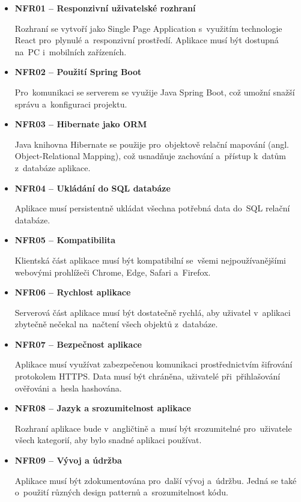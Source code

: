 \documentclass[twoside]{ctuthesis}
\begin{document}
\begin{itemize}
\item \textbf{NFR01 -- Responzivní uživatelské rozhraní}

Rozhraní se vytvoří jako Single Page Application s~využitím technologie React pro~plynulé a~responzivní prostředí. Aplikace musí být dostupná na~PC i~mobilních zařízeních.

\item \textbf{NFR02 -- Použití Spring Boot}

Pro~komunikaci se serverem se využije Java Spring Boot, což umožní snažší správu a~konfiguraci projektu.

\item \textbf{NFR03 -- Hibernate jako ORM}

Java knihovna Hibernate se použije pro~objektově relační mapování (angl. Object-Relational Mapping), což usnadňuje zachování a~přístup k~datům z~databáze aplikace.

\item \textbf{NFR04 -- Ukládání do SQL databáze}

Aplikace musí persistentně ukládat všechna potřebná data do~SQL relační databáze.

\item \textbf{NFR05 -- Kompatibilita}

Klientská část aplikace musí být kompatibilní se~všemi nejpoužívanějšími webovými prohlížeči Chrome, Edge, Safari a~Firefox.

\newpage

\item \textbf{NFR06 -- Rychlost aplikace}

Serverová část aplikace musí být dostatečně rychlá, aby uživatel v~aplikaci zbytečně nečekal na~načtení všech objektů z~databáze.

\item \textbf{NFR07 -- Bezpečnost aplikace}

Aplikace musí využívat zabezpečenou komunikaci prostřednictvím šifrování protokolem HTTPS. Data musí být chráněna, uživatelé při~přihlašování ověřováni a~hesla hashována.

\item \textbf{NFR08 -- Jazyk a srozumitelnost aplikace}

Rozhraní aplikace bude v~angličtině a~musí být srozumitelné pro~uživatele všech kategorií, aby bylo snadné aplikaci používat.

\item \textbf{NFR09 -- Vývoj a údržba}

Aplikace musí být zdokumentována pro~další vývoj a~údržbu. Jedná se také o~použití různých design patternů a~srozumitelnost kódu.
\end{itemize}
\end{document}
